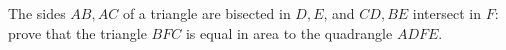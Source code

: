 The sides $AB, AC$ of a triangle are bisected in $D, E$, 
and $CD, BE$ intersect in $F$: prove that the triangle
$BFC$ is equal in area to the quadrangle $ADFE$.
